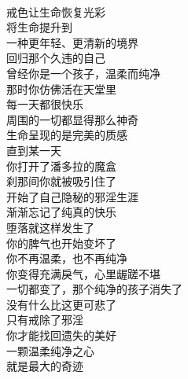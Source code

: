 \begin{poem}[温柔纯净之心]
    \begin{multicols}{2}
        \begin{center}~\\
            戒色让生命恢复光彩 \\ 将生命提升到 \\ 一种更年轻、更清新的境界 \\ 回归那个久违的自己 \\ 曾经你是一个孩子，温柔而纯净 \\ 那时你仿佛活在天堂里 \\ 每一天都很快乐 \\ 周围的一切都显得那么神奇 \\ 生命呈现的是完美的质感 \\ 直到某一天 \\ 你打开了潘多拉的魔盒 \\ 刹那间你就被吸引住了 \\ 开始了自己隐秘的邪淫生涯 \\ 渐渐忘记了纯真的快乐 \\ 堕落就这样发生了 \\ 你的脾气也开始变坏了 \\ 你不再温柔，也不再纯净 \\ 你变得充满戾气，心里龌蹉不堪 \\ 一切都变了，那个纯净的孩子消失了 \\ 没有什么比这更可悲了 \\ 只有戒除了邪淫 \\ 你才能找回遗失的美好 \\ 一颗温柔纯净之心 \\ 就是最大的奇迹
        \end{center}
    \end{multicols}
\end{poem}

